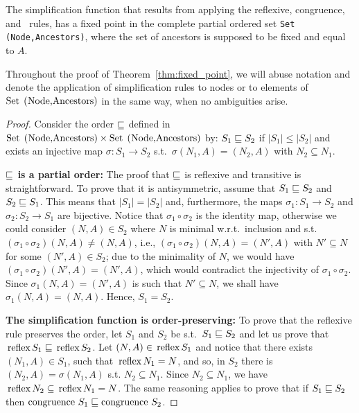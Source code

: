 \begin{theorem}
\label{thm:fixed_point}
	The simplification function that results from applying the reflexive,
	congruence, and \BPA\ rules, has a fixed point in the complete partial
	ordered set \lstinline{Set (Node,Ancestors)}, where the set of ancestors
	is supposed to be fixed and equal to $A$.
\end{theorem}

Throughout the proof of Theorem~\ref{thm:fixed_point}, we will abuse 
notation and denote the application of simplification rules
to nodes or to elements of $\text{\lstinline{Set (Node,Ancestors)}}$
in the same way, when no ambiguities arise.

\begin{proof}
	Consider the order 
	$\sqsubseteq$ defined in $\text{\lstinline{Set (Node,Ancestors)}}
	\times \text{\lstinline{Set (Node,Ancestors)}}$ by:
	$S_1 \sqsubseteq S_2$ if $|S_1| \leq |S_2|$ and
	exists an injective map $\sigma : S_1 \rightarrow S_2$ s.t.\  
	$\sigma(N_1,A) = (N_2,A)$ with $N_2\subseteq N_1$.\smallskip
	
	\noindent\textbf{$\sqsubseteq$ is a partial order:} The proof that
	$\sqsubseteq$ is reflexive and transitive is straightforward. 
	To prove that it is 
	antisymmetric, assume that $S_1\sqsubseteq S_2$ and $S_2 \sqsubseteq S_1$.
	This means that $|S_1|=|S_2|$ and, furthermore, the maps 
	$\sigma_1 : S_1 \rightarrow S_2$ and $\sigma_2 : S_2 \rightarrow S_1$
	are bijective. Notice that $\sigma_1\circ \sigma_2$  
	is the identity map, otherwise we could consider $(N,A)\in S_2$
	where $N$ is minimal w.r.t.\ inclusion and s.t.\
	$(\sigma_1\circ \sigma_2)(N,A) \neq (N,A)$, i.e.,
	$(\sigma_1\circ \sigma_2)(N,A) = (N',A)$ with $N'\subseteq N$ 
	for some $(N',A)\in S_2$;
	due to the minimality of $N$, we would have 
	$(\sigma_1\circ \sigma_2)(N',A) = (N',A)$, which would contradict the
	injectivity of $\sigma_1\circ \sigma_2$. Since
	$\sigma_1 (N,A) = (N',A)$ is such that $N'\subseteq N$, we shall 
	have $\sigma_1 (N,A) = (N,A)$. Hence, $S_1=S_2$.\smallskip
	
	\noindent\textbf{The simplification function is order-preserving:}
	To prove that the reflexive rule preserves the order, let $S_1$ and 
	$S_2$ be s.t.\ $S_1\sqsubseteq S_2$ and let us prove that 
	$\text{\lstinline{reflex}} S_1\leqSets\text{\lstinline{reflex}}S_2$.
	Let $(N,A)\in \text{\lstinline{reflex}} S_1$
	and notice that there exists $(N_1,A)\in S_1$, such that
	$\text{\lstinline{reflex}} N_1 = N $, and so,
	in $S_2$ there is $(N_2,A)=\sigma(N_1,A)$ s.t. $N_2\subseteq N_1$. 
	Since $N_2\subseteq N_1$, we have
	$\text{\lstinline{reflex}} N_2 \subseteq
    \text{\lstinline{reflex}} N_1 = N$.
	The same reasoning applies to prove that if $S_1\sqsubseteq S_2$ then 
	$\text{\lstinline{congruence} } S_1\leqSets\text{\lstinline{congruence} }S_2$.
	

\end{proof}
